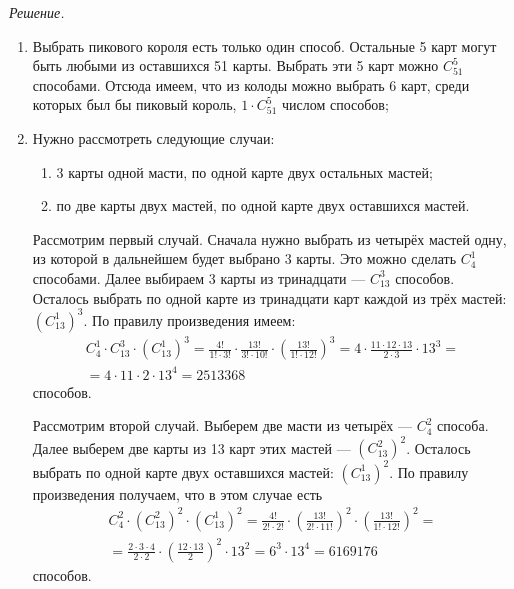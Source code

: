 \textit{Решение.}
\begin{enumerate}[label=\alph*)]
\item Выбрать пикового короля есть только один способ.
Остальные 5 карт могут быть любыми из оставшихся 51 карты.
Выбрать эти 5 карт можно $ C_{51}^5 $ способами.
Отсюда имеем, что из колоды можно выбрать 6 карт, среди которых был бы пиковый король, $ 1 \cdot C_{51}^5 $ числом способов;

\item Нужно рассмотреть следующие случаи:
\begin{enumerate}
\item 3 карты одной масти, по одной карте двух остальных мастей;
\item по две карты двух мастей, по одной карте двух оставшихся мастей.
\end{enumerate}

Рассмотрим первый случай.
Сначала нужно выбрать из четырёх мастей одну, из которой в дальнейшем будет выбрано 3 карты.
Это можно сделать $C_4^1$ способами.
Далее выбираем 3 карты из тринадцати --- $C_{13}^3$ способов.
Осталось выбрать по одной карте из тринадцати карт каждой из трёх мастей: $ \left( C_{13}^1 \right)^3$.
По правилу произведения имеем:
\begin{equation*}
\begin{split}
C_4^1 \cdot C_{13}^3 \cdot \left( C_{13}^1 \right)^3 =
\frac{4!}{1! \cdot 3!} \cdot \frac{13!}{3! \cdot 10!} \cdot \left( \frac{13!}{1! \cdot 12!} \right)^3 =
4 \cdot \frac{11 \cdot 12 \cdot 13}{2 \cdot 3} \cdot 13^3 = \\
= 4 \cdot 11 \cdot 2 \cdot 13^4 =
2513368
\end{split}
\end{equation*}
способов.

Рассмотрим второй случай.
Выберем две масти из четырёх --- $C_4^2$ способа.
Далее выберем две карты из 13 карт этих мастей --- $ \left( C_{13}^2 \right)^2$.
Осталось выбрать по одной карте двух оставшихся мастей: $ \left( C_{13}^1 \right)^2$.
По правилу произведения получаем, что в этом случае есть
\begin{equation*}
\begin{split}
C_4^2 \cdot \left( C_{13}^2 \right)^2 \cdot \left( C_{13}^1 \right)^2 =
\frac{4!}{2! \cdot 2!} \cdot \left( \frac{13!}{2! \cdot 11!} \right)^2 \cdot \left( \frac{13!}{1! \cdot 12!} \right)^2 = \\
= \frac{2 \cdot 3 \cdot 4}{2 \cdot 2} \cdot \left( \frac{12 \cdot 13}{2} \right)^2 \cdot 13^2 =
6^3 \cdot 13^4 =
6169176
\end{split}
\end{equation*}
способов.


\end{enumerate}
